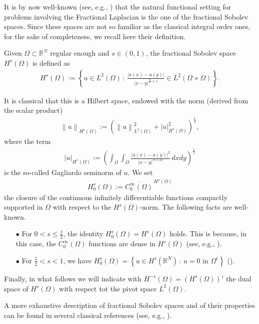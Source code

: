 \documentclass[reqno,twoside]{amsart}
\numberwithin{equation}{section}
\def\RR{{\mathbb{R}}}
\newcommand{\norm}[2]{{\left\|#1\right\|}_{#2}}
\begin{document}
It is by now well-known (see, e.g., \cite{dihitchhiker}) that the natural functional setting for problems involving the Fractional Laplacian is the one of the fractional Sobolev spaces. Since these spaces are not so familiar as the classical integral order ones, for the sake of completeness, we recall here their definition. 

Given $\Omega\subset\RR^N$ regular enough and $s\in(0,1)$, the fractional Sobolev space $H^s({\Omega})$ is defined as
\begin{align*}
	H^s(\Omega):= \left\{u\in L^2(\Omega)\,:\, \frac{|u(x)-u(y)|}{|x-y|^{\frac N2+s}}\in L^2(\Omega\times\Omega)\right\}.
\end{align*}

It is classical that this is a Hilbert space, endowed with the norm (derived from the scalar product)
\begin{align*}
	\norm{u}{H^s(\Omega)} := \left(\norm{u}{L^2(\Omega)}^2 + |u|_{H^s(\Omega)}^2\right)^{\frac 12},
\end{align*}
where the term 
\begin{align*}
	|u|_{H^s(\Omega)}:= \left(\int_\Omega\int_\Omega \frac{|u(x)-u(y)|^2}{|x-y|^{N+2s}}\,dxdy\right)^{\frac 12}
\end{align*}
is the so-called Gagliardo seminorm of $u$. We set 
\begin{align*}
	H_0^s(\Omega):= \overline{C_0^\infty(\Omega)}^{\,H^s(\Omega)}
\end{align*}
the closure of the continuous infinitely differentiable functions compactly supported in $\Omega$ with respect to the $H^s(\Omega)$-norm. The following facts are well-known.
\begin{itemize}
	\item[$\bullet$] For $0<s\leq\frac 12$, the identity $H_0^s(\Omega) = H^s(\Omega)$ holds. This is because, in this case, the $C_0^\infty(\Omega)$ functions are dense in $H^s(\Omega)$ (see, e.g., \cite[Theorem 11.1]{jllions1972non}).
	
	\item[$\bullet$] For $\frac 12<s<1$, we have $H_0^s(\Omega)=\left\{ u\in H^s(\RR^N)\,:\,u=0\textrm{ in } \Omega^c\right\}$ (\cite{fiscella2015density}).
\end{itemize}

Finally, in what follows we will indicate with $H^{-s}(\Omega)=\left(H^s(\Omega)\right)'$ the dual space of $H^s(\Omega)$ with respect tot the pivot space $L^2(\Omega)$.

A more exhaustive description of fractional Sobolev spaces and of their properties can be found in several classical references (see, e.g., \cite{adams2003sobolev,dihitchhiker,jllions1972non}).
\end{document}
